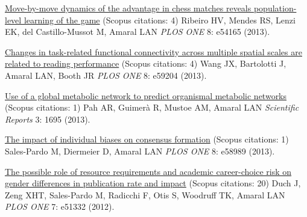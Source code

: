 \NumberedItem{\makebox[0.8cm][r]{[101]}}
\href{/people/amaral/move-move-dynamics-advantage-chess-matches-reveals-population-level-learning-game}
{Move-by-move dynamics of the advantage in chess matches reveals population-level learning of the game}
    (Scopus citations: 4)
\newline
Ribeiro HV, Mendes RS, Lenzi EK, del Castillo-Mussot M, Amaral LAN
\newline
\textit{PLOS ONE}
    8:
e54165 (2013).
\newline
\Gap
~
\Gap

\NumberedItem{\makebox[0.8cm][r]{[100]}}
\href{/people/amaral/changes-task-related-functional-connectivity-across-multiple-spatial-scales-are-related-reading-performance}
{Changes in task-related functional connectivity across multiple spatial scales are related to reading performance}
    (Scopus citations: 4)
\newline
Wang JX, Bartolotti J, Amaral LAN, Booth JR
\newline
\textit{PLOS ONE}
    8:
e59204 (2013).
\newline
\Gap
~
\Gap

\NumberedItem{\makebox[0.8cm][r]{[99]}}
\href{/people/amaral/use-global-metabolic-network-predict-organismal-metabolic-networks}
{Use of a global metabolic network to predict organismal metabolic networks}
    (Scopus citations: 1)
\newline
Pah AR, Guimer\`a R, Mustoe AM, Amaral LAN
\newline
\textit{Scientific Reports}
    3:
1695 (2013).
\newline
\Gap
~
\Gap

\NumberedItem{\makebox[0.8cm][r]{[98]}}
\href{/people/amaral/impact-individual-biases-consensus-formation}
{The impact of individual biases on consensus formation}
    (Scopus citations: 1)
\newline
Sales-Pardo M, Diermeier D, Amaral LAN
\newline
\textit{PLOS ONE}
    8:
e58989 (2013).
\newline
\Gap
~
\Gap

\NumberedItem{\makebox[0.8cm][r]{[97]}}
\href{/people/amaral/possible-role-resource-requirements-and-academic-career-choice-risk-gender-differences-publication-rate-and-impact}
{The possible role of resource requirements and academic career-choice risk on gender differences in publication rate and impact}
    (Scopus citations: 20)
\newline
Duch J, Zeng XHT, Sales-Pardo M, Radicchi F, Otis S, Woodruff TK, Amaral LAN
\newline
\textit{PLOS ONE}
    7:
e51332 (2012).
\newline
\Gap
~
\Gap

